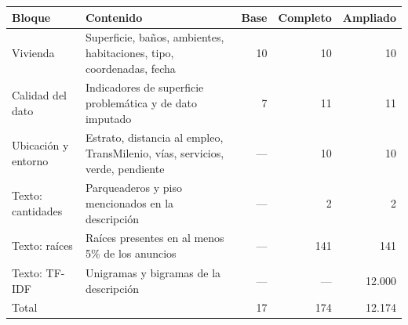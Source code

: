 
\begin{tabular}{llrrr}
\toprule
Bloque & Contenido & Base & Completo & Ampliado\\
\midrule
Vivienda & Superficie, baños, ambientes, habitaciones, tipo, coordenadas, fecha & 10 & 10 & 10\\
Calidad del dato & Indicadores de superficie problemática y de dato imputado & 7 & 11 & 11\\
Ubicación y entorno & Estrato, distancia al empleo, TransMilenio, vías, servicios, verde, pendiente & --- & 10 & 10\\
Texto: cantidades & Parqueaderos y piso mencionados en la descripción & --- & 2 & 2\\
Texto: raíces & Raíces presentes en al menos 5\% de los anuncios & --- & 141 & 141\\
Texto: TF-IDF & Unigramas y bigramas de la descripción & --- & --- & 12.000\\
Total &  & 17 & 174 & 12.174\\
\bottomrule
\end{tabular}
